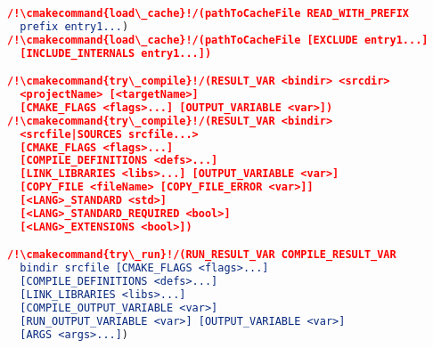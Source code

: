 \documentclass{article}
\newcommand{\cmakecommand}[1]{{\href{https://cmake.org/cmake/help/v3.20/command/#1.html}{#1}}}
\begin{document}
\begin{minipage}[t]{0.18\linewidth}
\begin{lstlisting}[language=CMake]
/!\cmakecommand{load\_cache}!/(pathToCacheFile READ_WITH_PREFIX
  prefix entry1...)
/!\cmakecommand{load\_cache}!/(pathToCacheFile [EXCLUDE entry1...]
  [INCLUDE_INTERNALS entry1...])

/!\cmakecommand{try\_compile}!/(RESULT_VAR <bindir> <srcdir>
  <projectName> [<targetName>]
  [CMAKE_FLAGS <flags>...] [OUTPUT_VARIABLE <var>])
/!\cmakecommand{try\_compile}!/(RESULT_VAR <bindir>
  <srcfile|SOURCES srcfile...>
  [CMAKE_FLAGS <flags>...]
  [COMPILE_DEFINITIONS <defs>...]
  [LINK_LIBRARIES <libs>...] [OUTPUT_VARIABLE <var>]
  [COPY_FILE <fileName> [COPY_FILE_ERROR <var>]]
  [<LANG>_STANDARD <std>]
  [<LANG>_STANDARD_REQUIRED <bool>]
  [<LANG>_EXTENSIONS <bool>])

/!\cmakecommand{try\_run}!/(RUN_RESULT_VAR COMPILE_RESULT_VAR
  bindir srcfile [CMAKE_FLAGS <flags>...]
  [COMPILE_DEFINITIONS <defs>...]
  [LINK_LIBRARIES <libs>...]
  [COMPILE_OUTPUT_VARIABLE <var>]
  [RUN_OUTPUT_VARIABLE <var>] [OUTPUT_VARIABLE <var>]
  [ARGS <args>...])
\end{lstlisting}
\end{minipage}
\hfill\vline\hfill
\end{document}
